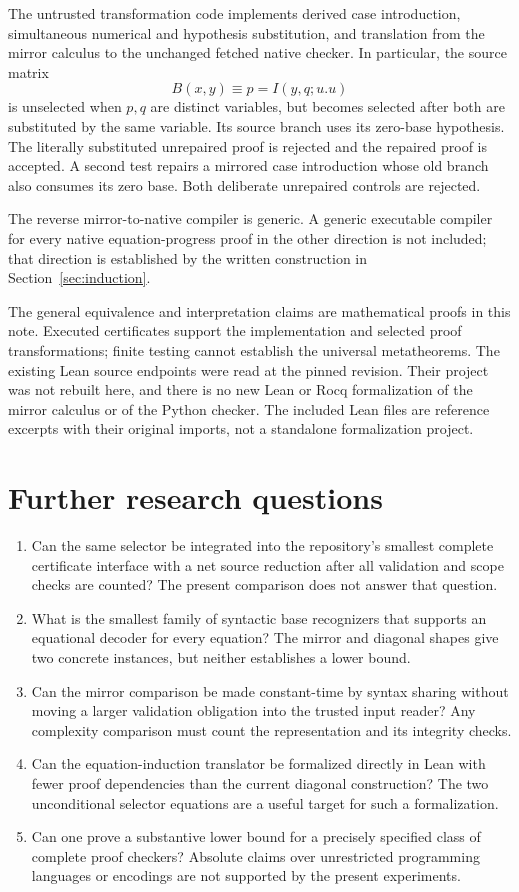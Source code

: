 \documentclass[11pt]{article}
\theoremstyle{definition}\newtheorem{definition}[theorem]{Definition}
\begin{document}
The untrusted transformation code implements derived case introduction,
simultaneous numerical and hypothesis substitution, and translation
from the mirror calculus to the unchanged fetched native checker.
In particular, the source matrix
\[
 B(x,y)\equiv p=I(y,q;u.u)
\]
is unselected when $p,q$ are distinct variables, but becomes selected
after both are substituted by the same variable. Its source branch
uses its zero-base hypothesis. The literally substituted unrepaired
proof is rejected and the repaired proof is accepted. A second test
repairs a mirrored case introduction whose old branch also consumes
its zero base. Both deliberate unrepaired controls are rejected.

The reverse mirror-to-native compiler is generic. A generic executable
compiler for every native equation-progress proof in the other
direction is not included; that direction is established by the
written construction in Section~\ref{sec:induction}.


The general equivalence and interpretation claims are mathematical
proofs in this note. Executed certificates support the implementation
and selected proof transformations; finite testing cannot establish
the universal metatheorems. The existing Lean source endpoints were
read at the pinned revision. Their project was not rebuilt here, and
there is no new Lean or Rocq formalization of the mirror calculus or
of the Python checker. The included Lean files are reference excerpts
with their original imports, not a standalone formalization project.

\section{Further research questions}
\begin{enumerate}
\item Can the same selector be integrated into the repository's smallest
complete certificate interface with a net source reduction after all
validation and scope checks are counted? The present comparison does
not answer that question.
\item What is the smallest family of syntactic base recognizers that
supports an equational decoder for every equation? The mirror and
diagonal shapes give two concrete instances, but neither establishes
a lower bound.
\item Can the mirror comparison be made constant-time by syntax sharing
without moving a larger validation obligation into the trusted input
reader? Any complexity comparison must count the representation and
its integrity checks.
\item Can the equation-induction translator be formalized directly in
Lean with fewer proof dependencies than the current diagonal
construction? The two unconditional selector equations are a useful
target for such a formalization.
\item Can one prove a substantive lower bound for a precisely specified
class of complete proof checkers? Absolute claims over unrestricted
programming languages or encodings are not supported by the present
experiments.
\end{enumerate}
\end{document}
